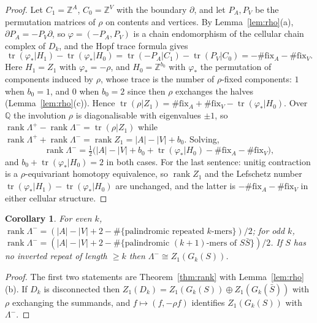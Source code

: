 \documentclass[11pt]{article}
\theoremstyle{plain}
\newtheorem{corollary}[theorem]{Corollary}
\theoremstyle{definition}
\theoremstyle{remark}
\newcommand{\Z}{\mathbb{Z}}
\newcommand{\Q}{\mathbb{Q}}
\newcommand{\rank}{\operatorname{rank}}
\newcommand{\tr}{\operatorname{tr}}
\newcommand{\Lm}{\Lambda^{-}}
\newcommand{\Lp}{\Lambda^{+}}
\begin{document}
\begin{proof}
Let $C_1=\Z^A$, $C_0=\Z^V$ with the boundary $\partial$, and let $P_A,P_V$ be the
permutation matrices of $\rho$ on contents and vertices. By Lemma~\ref{lem:rho}(a),
$\partial P_A=-P_V\partial$, so $\varphi=(-P_A,P_V)$ is a chain endomorphism of the cellular
chain complex of $D_k$, and the Hopf trace formula gives
\[
  \tr(\varphi_*|H_1)-\tr(\varphi_*|H_0)=\tr(-P_A|C_1)-\tr(P_V|C_0)
  =-\#\mathrm{fix}_A-\#\mathrm{fix}_V .
\]
Here $H_1=Z_1$ with $\varphi_*=-\rho$, and $H_0=\Z^{b_0}$ with $\varphi_*$ the permutation of
components induced by $\rho$, whose trace is the number of $\rho$-fixed components: $1$ when
$b_0=1$, and $0$ when $b_0=2$ since then $\rho$ exchanges the halves
(Lemma~\ref{lem:rho}(c)). Hence $\tr(\rho|Z_1)=\#\mathrm{fix}_A+\#\mathrm{fix}_V-
\tr(\varphi_*|H_0)$. Over $\Q$ the involution $\rho$ is diagonalisable with eigenvalues
$\pm1$, so $\rank\Lp-\rank\Lm=\tr(\rho|Z_1)$ while $\rank\Lp+\rank\Lm=\rank Z_1=|A|-|V|+b_0$.
Solving,
\[
  \rank\Lm=\tfrac12\big(|A|-|V|+b_0+\tr(\varphi_*|H_0)-\#\mathrm{fix}_A-\#\mathrm{fix}_V\big),
\]
and $b_0+\tr(\varphi_*|H_0)=2$ in both cases. For the last sentence: unitig contraction is a
$\rho$-equivariant homotopy equivalence, so $\rank Z_1$ and the Lefschetz number
$\tr(\varphi_*|H_1)-\tr(\varphi_*|H_0)$ are unchanged, and the latter is
$-\#\mathrm{fix}_A-\#\mathrm{fix}_V$ in either cellular structure.
\end{proof}

\begin{corollary}\label{cor:parity}
For even $k$, $\rank\Lm=(|A|-|V|+2-\#\{\text{palindromic repeated $k$-mers}\})/2$; for odd
$k$, $\rank\Lm=(|A|-|V|+2-\#\{\text{palindromic $(k{+}1)$-mers of $S\bar S$}\})/2$. If $S$
has no inverted repeat of length $\ge k$ then $\Lm\cong Z_1(G_k(S))$.
\end{corollary}

\begin{proof}
The first two statements are Theorem~\ref{thm:rank} with Lemma~\ref{lem:rho}(b). If $D_k$
is disconnected then $Z_1(D_k)=Z_1(G_k(S))\oplus Z_1(G_k(\bar S))$ with $\rho$ exchanging the
summands, and $f\mapsto(f,-\rho f)$ identifies $Z_1(G_k(S))$ with $\Lm$.
\end{proof}
\end{document}
